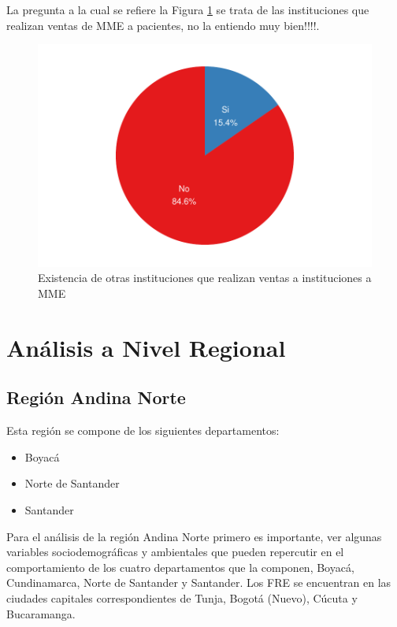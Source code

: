 \documentclass[
]{book}
\providecommand{\tightlist}{%
  \setlength{\itemsep}{0pt}\setlength{\parskip}{0pt}}
\begin{document}
La pregunta a la cual se refiere la Figura \ref{fig:InstitucionesAdicionales} se trata de las instituciones que realizan ventas de MME a pacientes, no la entiendo muy bien!!!!.

\begin{figure}
\includegraphics[width=0.85\linewidth]{InformeFinal_files/figure-latex/InstitucionesAdicionales-1} \caption{Existencia de otras instituciones que realizan ventas a instituciones a MME}\label{fig:InstitucionesAdicionales}
\end{figure}

\hypertarget{anuxe1lisis-a-nivel-regional}{%
\chapter{Análisis a Nivel Regional}\label{anuxe1lisis-a-nivel-regional}}

\hypertarget{regiuxf3n-andina-norte}{%
\section{Región Andina Norte}\label{regiuxf3n-andina-norte}}

Esta región se compone de los siguientes departamentos:

\begin{itemize}
\tightlist
\item
  Boyacá
\item
  Norte de Santander
\item
  Santander
\end{itemize}

Para el análisis de la región Andina Norte primero es importante, ver algunas variables sociodemográficas y ambientales que pueden repercutir en el comportamiento de los cuatro departamentos que la componen, Boyacá, Cundinamarca, Norte de Santander y Santander. Los FRE se encuentran en las ciudades capitales correspondientes de Tunja, Bogotá (Nuevo), Cúcuta y Bucaramanga.
\end{document}
